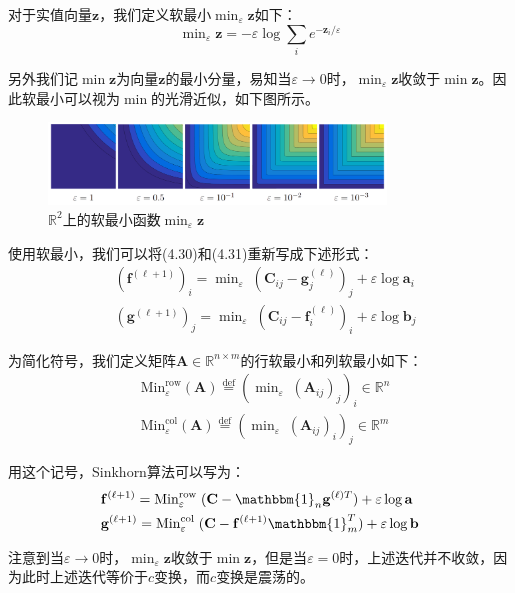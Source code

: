 \documentclass[cn,10pt,math=newtx,citestyle=gb7714-2015,bibstyle=gb7714-2015]{elegantbook}
\begin{document}
\begin{postulate}[软最小]
对于实值向量$\mathbf{z}$，我们定义软最小$\min_\varepsilon \mathbf{z}$如下：
\begin{equation}
    \label{4.32}
    \min\nolimits_\varepsilon \mathbf{z} = -\varepsilon \log \sum_i e^{-\mathbf{z}_i/\varepsilon}
\end{equation}

另外我们记$\min \mathbf{z}$为向量$\mathbf{z}$的最小分量，易知当$\varepsilon \to 0$时，$\min_\varepsilon \mathbf{z}$收敛于$\min \mathbf{z}$。因此软最小可以视为$\min$的光滑近似，如下图所示。

\begin{figure}[H]
    \centering
    \includegraphics[width=0.8\textwidth]{figure/fig4.9.png}
    \caption{$\mathbb{R}^2$上的软最小函数$\min_\varepsilon \mathbf{z}$}
    \label{图4.9}
\end{figure}

使用软最小，我们可以将(4.30)和(4.31)重新写成下述形式：
\begin{align}
    \label{4.33}
    & (\mathbf{f}^{(\ell+1)})_i = \min\nolimits_\varepsilon \;(\mathbf{C}_{ij}-\mathbf{g}_j^{(\ell)})_j + \varepsilon \log \mathbf{a}_i \\
    \label{4.34}
    & (\mathbf{g}^{(\ell+1)})_j = \min\nolimits_\varepsilon \;(\mathbf{C}_{ij}-\mathbf{f}_i^{(\ell)})_i + \varepsilon \log \mathbf{b}_j
\end{align}

为简化符号，我们定义矩阵$\mathbf{A}\in\mathbb{R}^{n\times m}$的行软最小和列软最小如下：
\begin{align*}
    & \text{Min}_\varepsilon^{\text{row}}(\mathbf{A}) \overset{\text{def}}{=} \left( \min\nolimits_\varepsilon\;(\mathbf{A}_{ij})_j \right)_i \in \mathbb{R}^n \\
    & \text{Min}_\varepsilon^{\text{col}}(\mathbf{A}) \overset{\text{def}}{=} \left( \min\nolimits_\varepsilon\;(\mathbf{A}_{ij})_i \right)_j \in \mathbb{R}^m
\end{align*}

用这个记号，Sinkhorn算法可以写为：
\begin{align}
    \label{4.35}
    & \mathbf{f}^{(\ell+1)} = \text{Min}_\varepsilon^{\text{row}} \;(\mathbf{C}-\mathbbm{1}_n\mathbf{g}^{(\ell)T}) + \varepsilon \log \mathbf{a} \\
    \label{4.36}
    & \mathbf{g}^{(\ell+1)} = \text{Min}_\varepsilon^{\text{col}} \;(\mathbf{C}-\mathbf{f}^{(\ell+1)}\mathbbm{1}_m^T) + \varepsilon \log \mathbf{b}
\end{align}

注意到当$\varepsilon \to 0$时，$\min_\varepsilon \mathbf{z}$收敛于$\min \mathbf{z}$，但是当$\varepsilon=0$时，上述迭代并不收敛，因为此时上述迭代等价于$c$变换，而$c$变换是震荡的。

\end{postulate}
\end{document}
